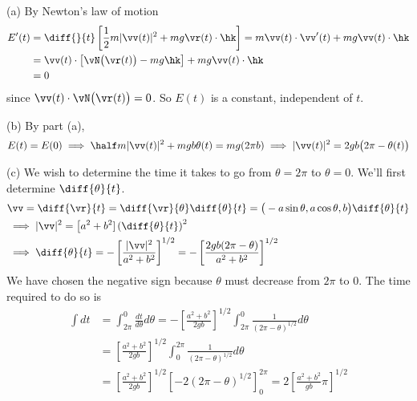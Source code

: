 \begin{solution}
(a) By Newton's law of motion
\begin{align*}
E'(t)&=\diff{}{t}\left[\frac{1}{2} m |\vv(t)|^2 +mg \vr(t)\cdot\hk\right]
=m\vv(t)\cdot\vv'(t)+mg\vv(t)\cdot\hk\\
&=\vv(t)\cdot\big[\vN\big(\vr(t)\big) - mg\hk\big]+mg\vv(t)\cdot\hk\\
&=0
\end{align*}
since $\vv(t)\cdot\vN\big(\vr(t)\big)=0$. So $E(t)$ is a constant, 
independent of $t$.

(b) By part (a),
\begin{align*}
E(t)=E(0) 
\implies  \half m |\vv(t)|^2 +mg b\theta(t) = mg(2\pi b)
\implies|\vv(t)|^2=2gb\big(2\pi-\theta(t)\big)
\end{align*}

(c) We wish to determine the time it takes to go from
$\theta=2\pi$ to $\theta=0$. We'll first determine $\diff{\theta}{t}$.
\begin{align*}
&\vv=\diff{\vr}{t}=\diff{\vr}{\theta}\diff{\theta}{t}
=\big(-a\sin\theta,a\cos\theta,b\big)\diff{\theta}{t} \\
&\implies
|\vv|^2=\big[a^2+b^2]\left(\diff{\theta}{t}\right)^2\\
&\implies \diff{\theta}{t}=-\left[\frac{|\vv|^2}{a^2+b^2}\right]^{1/2}
=-\left[\frac{2gb(2\pi-\theta)}{a^2+b^2}\right]^{1/2}
\end{align*}
We have chosen the negative sign because $\theta$ must decrease from $2\pi$
to 0. The time required to do so is
\begin{align*}
\int dt&=\int_{2\pi}^0 \frac{dt}{d\theta}d\theta
=-\left[\frac{a^2+b^2}{2gb}\right]^{1/2}\int_{2\pi}^0 \frac{1}{(2\pi-\theta)^{1/2}}d\theta \\
&=\left[\frac{a^2+b^2}{2gb}\right]^{1/2}\int^{2\pi}_0 \frac{1}{(2\pi-\theta)^{1/2}}d\theta\\
&=\left[\frac{a^2+b^2}{2gb}\right]^{1/2}
\left[-2(2\pi-\theta)^{1/2}\right]_0^{2\pi}
=2\left[\frac{a^2+b^2}{gb}\pi\right]^{1/2}
\end{align*}
\end{solution}
